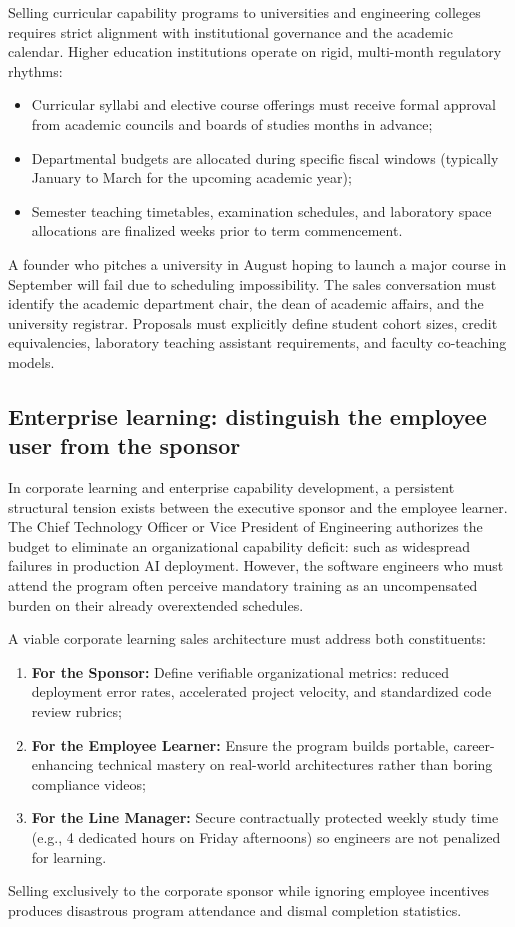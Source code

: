 Selling curricular capability programs to universities and engineering colleges requires strict alignment with institutional governance and the academic calendar. Higher education institutions operate on rigid, multi-month regulatory rhythms:
\begin{itemize}
\item Curricular syllabi and elective course offerings must receive formal approval from academic councils and boards of studies months in advance;
\item Departmental budgets are allocated during specific fiscal windows (typically January to March for the upcoming academic year);
\item Semester teaching timetables, examination schedules, and laboratory space allocations are finalized weeks prior to term commencement.
\end{itemize}
A founder who pitches a university in August hoping to launch a major course in September will fail due to scheduling impossibility. The sales conversation must identify the academic department chair, the dean of academic affairs, and the university registrar. Proposals must explicitly define student cohort sizes, credit equivalencies, laboratory teaching assistant requirements, and faculty co-teaching models.

\subsection{Enterprise learning: distinguish the employee user from the sponsor}

In corporate learning and enterprise capability development, a persistent structural tension exists between the executive sponsor and the employee learner. The Chief Technology Officer or Vice President of Engineering authorizes the budget to eliminate an organizational capability deficit: such as widespread failures in production AI deployment. However, the software engineers who must attend the program often perceive mandatory training as an uncompensated burden on their already overextended schedules.

A viable corporate learning sales architecture must address both constituents:
\begin{enumerate}
\item \textbf{For the Sponsor:} Define verifiable organizational metrics: reduced deployment error rates, accelerated project velocity, and standardized code review rubrics;
\item \textbf{For the Employee Learner:} Ensure the program builds portable, career-enhancing technical mastery on real-world architectures rather than boring compliance videos;
\item \textbf{For the Line Manager:} Secure contractually protected weekly study time (e.g., 4 dedicated hours on Friday afternoons) so engineers are not penalized for learning.
\end{enumerate}
Selling exclusively to the corporate sponsor while ignoring employee incentives produces disastrous program attendance and dismal completion statistics.

